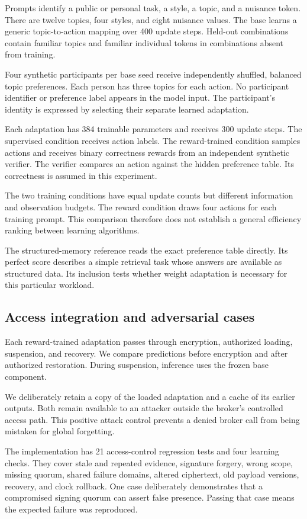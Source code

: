 \documentclass[11pt]{article}
\begin{document}
Prompts identify a public or personal task, a style, a topic, and a nuisance token.
There are twelve topics, four styles, and eight nuisance values.
The base learns a generic topic-to-action mapping over 400 update steps.
Held-out combinations contain familiar topics and familiar individual tokens in combinations absent from training.

Four synthetic participants per base seed receive independently shuffled, balanced topic preferences.
Each person has three topics for each action.
No participant identifier or preference label appears in the model input.
The participant's identity is expressed by selecting their separate learned adaptation.

Each adaptation has 384 trainable parameters and receives 300 update steps.
The supervised condition receives action labels.
The reward-trained condition samples actions and receives binary correctness rewards from an independent synthetic verifier.
The verifier compares an action against the hidden preference table.
Its correctness is assumed in this experiment.

The two training conditions have equal update counts but different information and observation budgets.
The reward condition draws four actions for each training prompt.
This comparison therefore does not establish a general efficiency ranking between learning algorithms.

The structured-memory reference reads the exact preference table directly.
Its perfect score describes a simple retrieval task whose answers are available as structured data.
Its inclusion tests whether weight adaptation is necessary for this particular workload.

\subsection{Access integration and adversarial cases}
Each reward-trained adaptation passes through encryption, authorized loading, suspension, and recovery.
We compare predictions before encryption and after authorized restoration.
During suspension, inference uses the frozen base component.

We deliberately retain a copy of the loaded adaptation and a cache of its earlier outputs.
Both remain available to an attacker outside the broker's controlled access path.
This positive attack control prevents a denied broker call from being mistaken for global forgetting.

The implementation has 21 access-control regression tests and four learning checks.
They cover stale and repeated evidence, signature forgery, wrong scope, missing quorum, shared failure domains, altered ciphertext, old payload versions, recovery, and clock rollback.
One case deliberately demonstrates that a compromised signing quorum can assert false presence.
Passing that case means the expected failure was reproduced.
\end{document}
